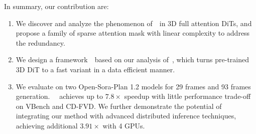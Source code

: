

In summary, our contribution are:
\begin{enumerate}
    \item We discover and analyze the phenomenon of~\patternname~in 3D full attention DiTs, and propose a family of sparse attention mask with linear complexity to address the redundancy.
    \item We design a framework~\methodname~based on our analysis of~\patternname, which turns pre-trained 3D DiT to a fast variant in a data efficient manner.%
    \item We evaluate on two Open-Sora-Plan 1.2 models for 29 frames and 93 frames generation. ~\methodname~achieves up to $7.8\times$ speedup with little performance trade-off on VBench and CD-FVD. We further demonstrate the potential of integrating our method with advanced distributed inference techniques, achieving additional $3.91\times$ with 4 GPUs.
\end{enumerate}

